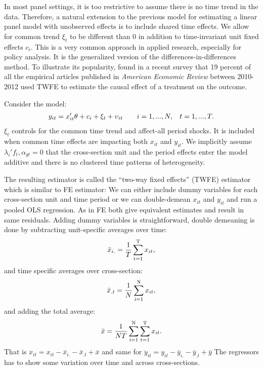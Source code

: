 In most panel settings, it is too restrictive to assume there is no time trend in the data. Therefore, a natural extension to the previous model for estimating a linear panel model with unobserved effects is to include shared time effects. We allow for common trend $\xi_t$ to be different than 0 in addition to time-invariant unit fixed effects $c_i$. This is a very common approach in applied research, especially for policy analysis. It is the generalized version of the differences-in-differences method. To illustrate its popularity, \textcite{de2020two} found in a recent survey that 19 percent of all the empirical articles published in \textit{American Economic Review} between 2010-2012 used TWFE to estimate the causal effect of a treatment on the outcome.

Consider the model:
\begin{align}
y_{it} = x_{it}'\theta + c_i + \xi_t + \upsilon_{it} \hspace{0.7cm} i=1,...,N, \hspace{0.3cm} t=1,...,T.
\end{align}
$\xi_t$ controls for the common time trend and affect-all period shocks. It is included when common time effects are impacting both $x_{it}$ and $y_{it}$. We implicitly assume $\lambda_i' f_t, \alpha_{gt} = 0$ that the cross-section unit and the period effects enter the model additive and there is no clustered time patterns of heterogeneity.

The resulting estimator is called the “two-way fixed effects” (TWFE) estimator which is similar to FE estimator:
We can either include dummy variables for each cross-section unit and time period or we can double-demean $x_{it}$ and $y_{it}$ and run a pooled OLS regression. As in FE both give equivalent estimates and result in same residuals. Adding dummy variables is straightforward, double demeaning is done by subtracting unit-specific averages over time:
\begin{align*}
      \bar{x}_{i.} = \dfrac{1}{T} \operatorname*{\sum_{t=1}^T} x_{it},
\end{align*}
and time specific averages over cross-section:
\begin{align*}
      \bar{x}_{.t} = \dfrac{1}{N} \operatorname*{\sum_{i=1}^N} x_{it},
\end{align*}
and adding the total average:
\begin{align*}
      \bar{x} = \dfrac{1}{NT} \operatorname*{\sum_{i=1}^N} \operatorname*{\sum_{t=1}^T} x_{it}.
\end{align*}
That is $\ddot x_{it} = x_{it} -  \bar{x}_{i.} - \bar{x}_{.t} + \bar{x} $ and same for  $\ddot y_{it} = y_{it} -  \bar{y}_{i.} - \bar{y}_{.t} + \bar{y}$ The regressors has to show some variation over time and across cross-sections.

